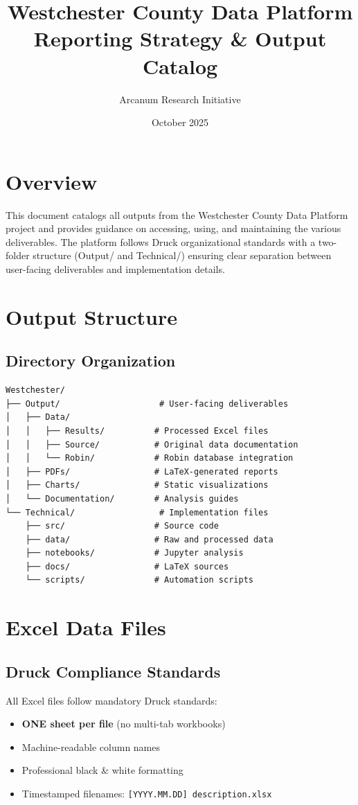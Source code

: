 \documentclass[11pt,letterpaper]{article}
\title{\textbf{Westchester County Data Platform}\\Reporting Strategy \& Output Catalog}
\author{Arcanum Research Initiative}
\date{October 2025}
\begin{document}
\maketitle

\tableofcontents
\newpage

\section{Overview}

This document catalogs all outputs from the Westchester County Data Platform project and provides guidance on accessing, using, and maintaining the various deliverables. The platform follows Druck organizational standards with a two-folder structure (Output/ and Technical/) ensuring clear separation between user-facing deliverables and implementation details.

\section{Output Structure}

\subsection{Directory Organization}
\begin{verbatim}
Westchester/
├── Output/                    # User-facing deliverables
│   ├── Data/
│   │   ├── Results/          # Processed Excel files
│   │   ├── Source/           # Original data documentation
│   │   └── Robin/            # Robin database integration
│   ├── PDFs/                 # LaTeX-generated reports
│   ├── Charts/               # Static visualizations
│   └── Documentation/        # Analysis guides
└── Technical/                 # Implementation files
    ├── src/                  # Source code
    ├── data/                 # Raw and processed data
    ├── notebooks/            # Jupyter analysis
    ├── docs/                 # LaTeX sources
    └── scripts/              # Automation scripts
\end{verbatim}

\section{Excel Data Files}

\subsection{Druck Compliance Standards}
All Excel files follow mandatory Druck standards:
\begin{itemize}
    \item \textbf{ONE sheet per file} (no multi-tab workbooks)
    \item Machine-readable column names
    \item Professional black \& white formatting
    \item Timestamped filenames: \texttt{[YYYY.MM.DD] description.xlsx}
\end{itemize}
\end{document}
